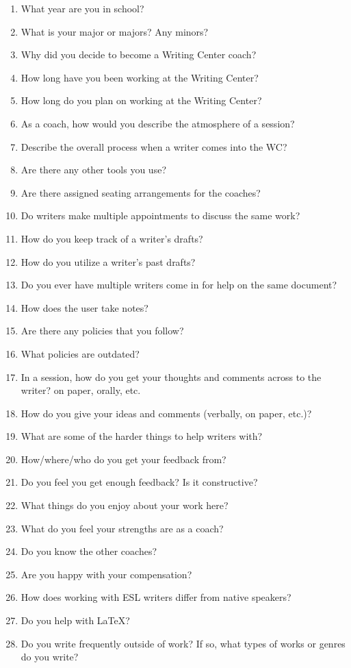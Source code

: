 \documentclass[12pt]{article} %
\begin{document}
  \begin{enumerate} \itemsep1pt \parskip0pt 
  	\item What year are you in school?
  	\item What is your major or majors?  Any minors?
  	\item Why did you decide to become a Writing Center coach?
  	\item How long have you been working at the Writing Center?
  	\item How long do you plan on working at the Writing Center?
  	\item As a coach, how would you describe the atmosphere of a session?
  	\item Describe the overall process when a writer comes into the WC?
  	\item Are there any other tools you use?
  	\item Are there assigned seating arrangements for the coaches?
  	\item Do writers make multiple appointments to discuss the same work?
  	\item How do you keep track of a writer’s drafts?
  	\item How do you utilize a writer’s past drafts?
  	\item Do you ever have multiple writers come in for help on the same document?
  	\item How does the user take notes?
  	\item Are there any policies that you follow? 
  	\item What policies are outdated?  
  	\item In a session, how do you get your thoughts and comments across to the writer? {on paper, orally, etc.}
  	\item How do you give your ideas and comments (verbally, on paper, etc.)?
  	\item What are some of the harder things to help writers with?
  	\item How/where/who do you get your feedback from?
  	\item Do you feel you get enough feedback? Is it constructive?
  	\item What things do you enjoy about your work here?
  	\item What do you feel your strengths are as a coach?
  	\item Do you know the other coaches?
  	\item Are you happy with your compensation?
  	\item How does working with ESL writers differ from native speakers?
  	\item Do you help with LaTeX?
  	\item Do you write frequently outside of work?  If so, what types of works or genres do you write?
  \end{enumerate}
\end{document}

